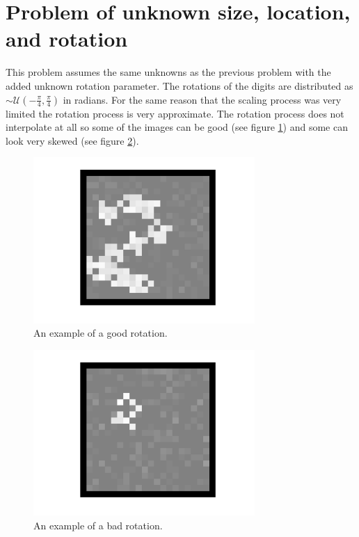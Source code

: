 \documentclass[12pt]{article}
\begin{document}
\section{Problem of unknown size, location, and rotation}
	This problem assumes the same unknowns as the previous problem with the added unknown
		rotation parameter.
	The rotations of the digits are distributed as $\sim\mathcal{U}(-\frac{\pi}{4},\frac{\pi}{4})$
		in radians.
	For the same reason that the scaling process was very limited the rotation process is
		very approximate.
	The rotation process does not interpolate at all so some of the images can be good
		(see figure \ref{fig:goodRotation}) and some can look very skewed (see figure
		\ref{fig:badRotation}).
	\begin{figure}[h]
		\centering
		\includegraphics[width=0.75\textwidth]{goodRotation.png}
		\caption{An example of a good rotation.}
		\label{fig:goodRotation}
	\end{figure}
	\begin{figure}[h]
		\centering
		\includegraphics[width=0.75\textwidth]{badRotation.png}
		\caption{An example of a bad rotation.}
		\label{fig:badRotation}
	\end{figure}
\end{document}
